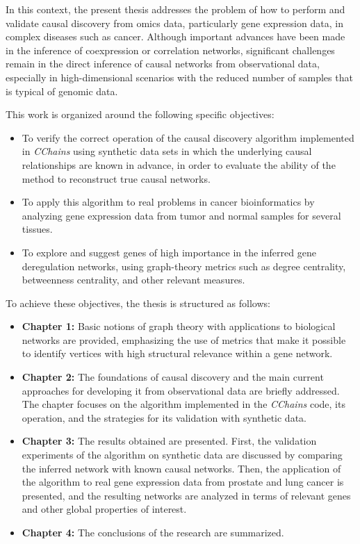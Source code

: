 \documentclass[12pt,a4paper]{report}
\begin{document}
In this context, the present thesis addresses the problem of how to perform and validate causal discovery from omics data, particularly gene expression data, in complex diseases such as cancer. Although important advances have been made in the inference of coexpression or correlation networks\cite{coexpresion}, significant challenges remain in the direct inference of causal networks from observational data\cite{observacionales}, especially in high-dimensional scenarios with the reduced number of samples that is typical of genomic data\cite{dimentionality}.

This work is organized around the following specific objectives:

\begin{itemize}
    \item To verify the correct operation of the causal discovery algorithm implemented in \textit{CChains} using synthetic data sets in which the underlying causal relationships are known in advance, in order to evaluate the ability of the method to reconstruct true causal networks.
    \item To apply this algorithm to real problems in cancer bioinformatics by analyzing gene expression data from tumor and normal samples for several tissues.
    \item To explore and suggest genes of high importance in the inferred gene deregulation networks, using graph-theory metrics such as degree centrality, betweenness centrality, and other relevant measures.
\end{itemize}

To achieve these objectives, the thesis is structured as follows:

\begin{itemize}
	\item \textbf{Chapter 1:} Basic notions of graph theory with applications to biological networks are provided, emphasizing the use of metrics that make it possible to identify vertices with high structural relevance within a gene network.

    \item \textbf{Chapter 2:} The foundations of causal discovery and the main current approaches for developing it from observational data are briefly addressed. The chapter focuses on the algorithm implemented in the \textit{CChains} code, its operation, and the strategies for its validation with synthetic data.

    \item \textbf{Chapter 3:} The results obtained are presented. First, the validation experiments of the algorithm on synthetic data are discussed by comparing the inferred network with known causal networks. Then, the application of the algorithm to real gene expression data from prostate and lung cancer is presented, and the resulting networks are analyzed in terms of relevant genes and other global properties of interest.

	\item \textbf{Chapter 4:} The conclusions of the research are summarized.    
    
\end{itemize}
\end{document}
